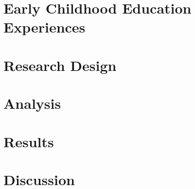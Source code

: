 \section{Early Childhood Education Experiences}
\label{sec:eceexperiences}


\section{Research Design}
\label{sec:data}



\section{Analysis}
\label{sec:methodology}
%


\section{Results}
\label{sec:result}


\section{Discussion}
\label{sec:discussion}


\clearpage






